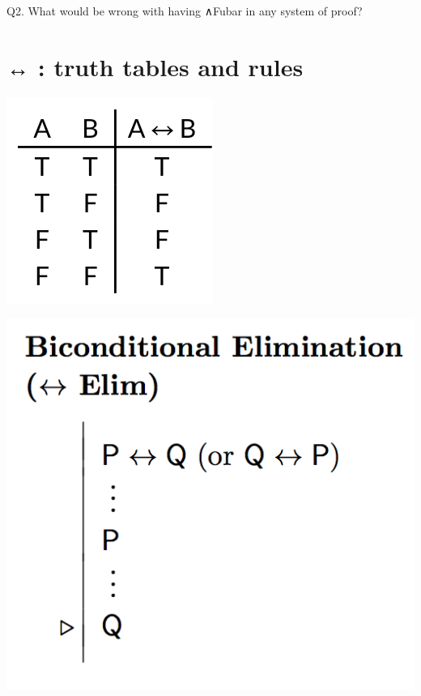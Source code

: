 \documentclass[12pt]{extarticle}
\begin{document}
\begin{multicols*}{3}
\begin{minipage}{\columnwidth}
Q2. What would be wrong with having ∧Fubar in any system of proof?
 
\end{minipage}
 
 
 
\section{↔ : truth tables and rules}
 
\begin{center}
\includegraphics[scale=0.3]{img/tt_biconditional.png}
\end{center}
\begin{center}
\includegraphics[scale=0.3]{img/rule_biconditional_elim.png}
\end{center}
\begin{center}

\end{center}
\end{multicols*}
\end{document}
